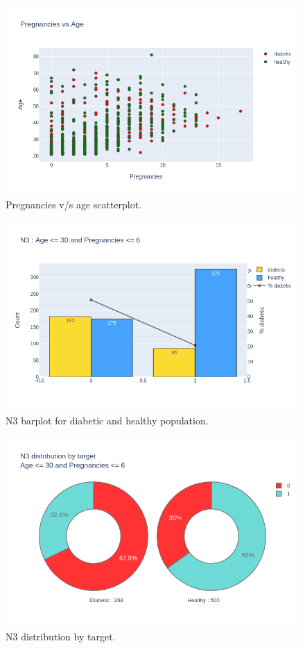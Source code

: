 \documentclass[12pt]{article}
\begin{document}
\begin{figure}[ht]
\centering
\includegraphics[width=1\textwidth]{newplot(17).png}
\caption{\label{fig:27} Pregnancies v/s age scatterplot.}
\end{figure}

\begin{figure}[ht]
\centering
\includegraphics[width=1\textwidth]{newplot(18).png}
\caption{\label{fig:28} N3 barplot for diabetic and healthy population.}
\end{figure}

\begin{figure}[ht]
\centering
\includegraphics[width=1\textwidth]{newplot(19).png}
\caption{\label{fig:29} N3 distribution by target.}
\end{figure}
\end{document}
